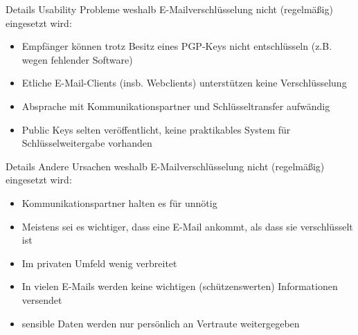 \documentclass[]{beamer}
\begin{document}
\begin{frame}{Details}
	Usability Probleme weshalb E-Mailverschlüsselung nicht (regelmäßig) eingesetzt wird:
	\begin{itemize}[<+->]
	  \item Empfänger können trotz Besitz eines PGP-Keys nicht entschlüsseln (z.B. wegen fehlender Software)
	  \item Etliche E-Mail-Clients (insb. Webclients) unterstützen keine Verschlüsselung
	  \item Absprache mit Kommunikationspartner und Schlüsseltransfer aufwändig
	  \item Public Keys selten veröffentlicht, keine praktikables System für Schlüsselweitergabe vorhanden
  \end{itemize}
\end{frame}

\begin{frame}{Details}
	Andere Ursachen weshalb E-Mailverschlüsselung nicht (regelmäßig) eingesetzt wird:
	\begin{itemize}[<+->]
	  \item Kommunikationspartner halten es für unnötig
	  \item Meistens sei es wichtiger, dass eine E-Mail ankommt, als dass sie verschlüsselt ist
	  \item Im privaten Umfeld wenig verbreitet
	  \item In vielen E-Mails werden keine wichtigen (schützenswerten) Informationen versendet
	  \item sensible Daten werden nur persönlich an Vertraute weitergegeben
	\end{itemize}
	
\end{frame}
\end{document}
